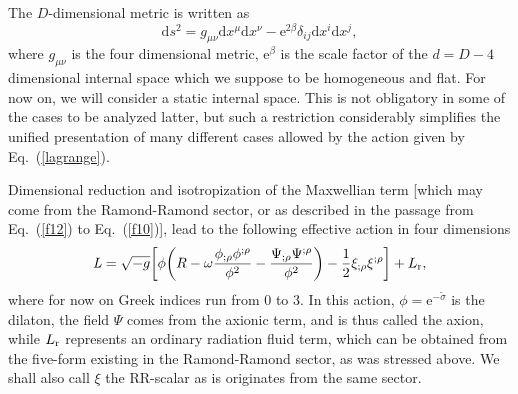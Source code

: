 \documentclass[a4paper,aps,twocolumn,prd,showpacs,nofootinbib]{revtex4}
\newcommand{\dd}{\mathrm{d}}
\newcommand{\ee}{\mathrm{e}}
\begin{document}
The $D$-dimensional metric is written as
\begin{equation}
\dd s^2 = g_{\mu\nu}\dd x^\mu \dd x^\nu -
\ee^{2\beta}\delta_{ij}\dd x^i \dd x^j,
\end{equation}
where $g_{\mu\nu}$ is the four dimensional metric, $\ee^\beta$ is the
scale factor of the $d = D - 4$ dimensional internal space which we
suppose to be homogeneous and flat. For now on, we will consider a
static internal space. This is not obligatory in some of the cases to
be analyzed latter, but such a restriction considerably simplifies the
unified presentation of many different cases allowed by the action
given by Eq.~(\ref{lagrange}).

Dimensional reduction and isotropization of the Maxwellian term [which
may come from the Ramond-Ramond sector, or as described in the passage
from Eq.~(\ref{f12}) to Eq.~(\ref{f10})], lead to the following
effective action in four dimensions
\begin{equation}
\label{l1} {\it L} = \sqrt{-g}\biggl[\phi\biggl(R -
\omega\frac{\phi_{;\rho}\phi^{;\rho}}{\phi^2} -
\frac{\Psi_{;\rho}\Psi^{;\rho}}{\phi^{2}}\biggr) -
\frac{1}{2}\xi_{;\rho}\xi^{;\rho}\biggr] + L_{\rm r},
\end{equation}
where for now on Greek indices run from 0 to 3.  In this action, $\phi
= \ee^{-\tilde\sigma}$ is the dilaton, the field $\Psi$ comes from the
axionic term, and is thus called the axion, while $L_{\rm r}$
represents an ordinary radiation fluid term, which can be obtained
from the five-form existing in the Ramond-Ramond sector, as was
stressed above. We shall also call $\xi$ the RR-scalar as is
originates from the same sector.
\end{document}
